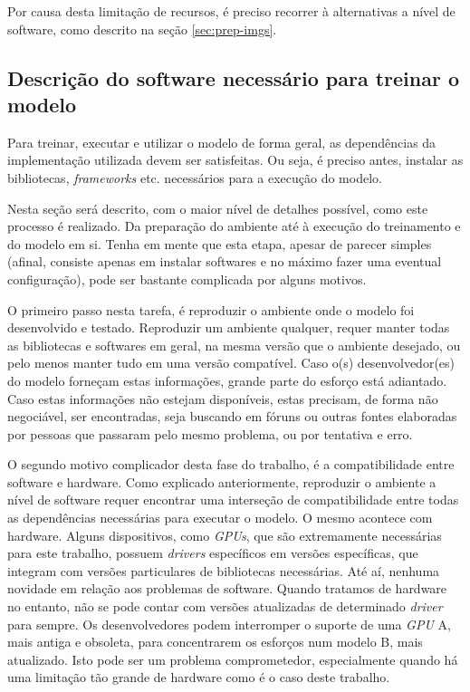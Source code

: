 Por causa desta limitação de recursos, é preciso recorrer à alternativas a nível de software, como descrito na seção \ref{sec:prep-imgs}.


\subsection{Descrição do software necessário para treinar o modelo}

Para treinar, executar e utilizar o modelo de forma geral, as dependências da implementação utilizada devem ser satisfeitas. Ou seja, é preciso antes, instalar as bibliotecas, \textit{frameworks} etc. necessários para a execução do modelo.

Nesta seção será descrito, com o maior nível de detalhes possível, como este processo é realizado. Da preparação do ambiente até à execução do treinamento e do modelo em si. Tenha em mente que esta etapa, apesar de parecer simples (afinal, consiste apenas em instalar softwares e no máximo fazer uma eventual configuração), pode ser bastante complicada por alguns motivos.

O primeiro passo nesta tarefa, é reproduzir o ambiente onde o modelo foi desenvolvido e testado. Reproduzir um ambiente qualquer, requer manter todas as bibliotecas e softwares em geral, na mesma versão que o ambiente desejado, ou pelo menos manter tudo em uma versão compatível. Caso o(s) desenvolvedor(es) do modelo forneçam estas informações, grande parte do esforço está adiantado. Caso estas informações não estejam disponíveis, estas precisam, de forma não negociável, ser encontradas, seja buscando em fóruns ou outras fontes elaboradas por pessoas que passaram pelo mesmo problema, ou por tentativa e erro.

O segundo motivo complicador desta fase do trabalho, é a compatibilidade entre software e hardware. Como explicado anteriormente, reproduzir o ambiente a nível de software requer encontrar uma interseção de compatibilidade entre todas as dependências necessárias para executar o modelo. O mesmo acontece com hardware. Alguns dispositivos, como \textit{GPUs}, que são extremamente necessárias para este trabalho, possuem \textit{drivers} específicos em versões específicas, que integram com versões particulares de bibliotecas necessárias. Até aí, nenhuma novidade em relação aos problemas de software. Quando tratamos de hardware no entanto, não se pode contar com versões atualizadas de determinado \textit{driver} para sempre. Os desenvolvedores podem interromper o suporte de uma \textit{GPU} A, mais antiga e obsoleta, para concentrarem os esforços num modelo B, mais atualizado. Isto pode ser um problema comprometedor, especialmente quando há uma limitação tão grande de hardware como é o caso deste trabalho.

